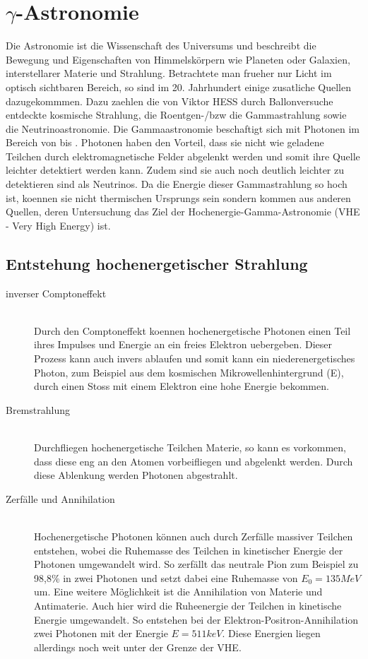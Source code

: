 \chapter{$\gamma$-Astronomie} 
Die Astronomie ist die Wissenschaft des Universums und beschreibt die Bewegung und Eigenschaften von Himmelskörpern wie Planeten oder Galaxien, interstellarer Materie und Strahlung. Betrachtete man frueher nur Licht im optisch sichtbaren Bereich, so sind im 20. Jahrhundert einige zusatliche Quellen dazugekommmen. Dazu zaehlen die von Viktor HESS durch Ballonversuche entdeckte kosmische Strahlung, die Roentgen-/bzw die Gammastrahlung sowie die Neutrinoastronomie. Die Gammaastronomie beschaftigt sich mit Photonen im Bereich von bis . Photonen haben den Vorteil, dass sie nicht wie geladene Teilchen durch elektromagnetische Felder abgelenkt werden und somit ihre Quelle leichter detektiert werden kann. Zudem sind sie auch noch deutlich leichter zu detektieren sind als Neutrinos. Da die Energie dieser Gammastrahlung so hoch ist, koennen sie nicht thermischen Ursprungs sein sondern kommen aus anderen Quellen, deren Untersuchung das Ziel der Hochenergie-Gamma-Astronomie (VHE - Very High Energy) ist.


\section{Entstehung hochenergetischer Strahlung}

\begin{description}
\item[inverser Comptoneffekt]\hfill \\
Durch den Comptoneffekt koennen hochenergetische Photonen einen Teil ihres Impulses und Energie an ein freies Elektron uebergeben. Dieser Prozess kann auch invers ablaufen und somit kann ein niederenergetisches Photon, zum Beispiel aus dem kosmischen Mikrowellenhintergrund (E), durch einen Stoss mit einem Elektron eine hohe Energie bekommen.
\item[Bremstrahlung]\hfill \\
Durchfliegen hochenergetische Teilchen Materie, so kann es vorkommen, dass diese eng an den Atomen vorbeifliegen und abgelenkt werden. Durch diese Ablenkung werden Photonen abgestrahlt.
\item[Zerfälle und Annihilation]\hfill \\ 
Hochenergetische Photonen können auch durch Zerfälle massiver Teilchen entstehen, wobei die Ruhemasse des Teilchen in kinetischer Energie der Photonen umgewandelt wird. So zerfällt das neutrale Pion zum Beispiel zu 98,8\% \cite{PDG} in zwei Photonen und setzt dabei eine Ruhemasse von $E_0=135MeV$ \cite{PDG} um. Eine weitere Möglichkeit ist die Annihilation von Materie und Antimaterie. Auch hier wird die Ruheenergie der Teilchen in kinetische Energie umgewandelt. So entstehen bei der Elektron-Positron-Annihilation zwei Photonen mit der Energie $E=511keV$.
Diese Energien liegen allerdings noch weit unter der Grenze der VHE.

\end{description}

